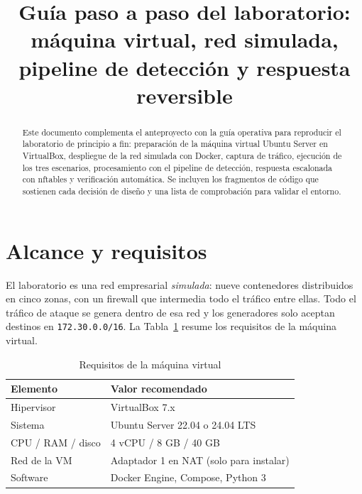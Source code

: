 \documentclass[conference,onecolumn]{IEEEtran}
\newcommand{\cmd}[1]{\texttt{#1}}
\begin{document}
\title{Guía paso a paso del laboratorio: máquina virtual, red simulada, pipeline de detección y respuesta reversible}
\author{
}
\maketitle

\begin{abstract}
Este documento complementa el anteproyecto con la guía operativa para reproducir el laboratorio de principio a fin: preparación de la máquina virtual Ubuntu Server en VirtualBox, despliegue de la red simulada con Docker, captura de tráfico, ejecución de los tres escenarios, procesamiento con el pipeline de detección, respuesta escalonada con nftables y verificación automática. Se incluyen los fragmentos de código que sostienen cada decisión de diseño y una lista de comprobación para validar el entorno.
\end{abstract}

\section{Alcance y requisitos}
El laboratorio es una red empresarial \emph{simulada}: nueve contenedores distribuidos en cinco zonas, con un firewall que intermedia todo el tráfico entre ellas. Todo el tráfico de ataque se genera dentro de esa red y los generadores solo aceptan destinos en \cmd{172.30.0.0/16}. La Tabla~\ref{tab:req} resume los requisitos de la máquina virtual.

\begin{table}[htbp]
\centering
\caption{Requisitos de la máquina virtual}
\label{tab:req}
\footnotesize
\begin{tabular}{@{}ll@{}}
\toprule
Elemento & Valor recomendado \\
\midrule
Hipervisor & VirtualBox 7.x \\
Sistema & Ubuntu Server 22.04 o 24.04 LTS \\
CPU / RAM / disco & 4 vCPU / 8 GB / 40 GB \\
Red de la VM & Adaptador 1 en NAT (solo para instalar) \\
Software & Docker Engine, Compose, Python 3 \\
\bottomrule
\end{tabular}
\end{table}
\end{document}
